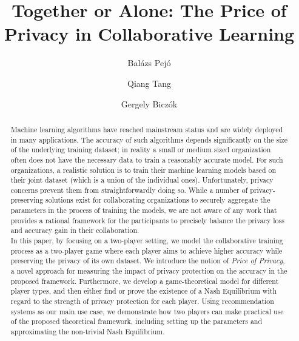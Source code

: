 \documentclass[USenglish,oneside,twocolumn]{article}
\theoremstyle{plain}
\begin{document}

\author*[1]{Bal\'azs Pej\'o}
\author[2]{Qiang Tang}
\author[3]{Gergely Bicz\'ok}


\title{\huge Together or Alone: The Price of Privacy in Collaborative Learning}

	\begin{abstract}
		{Machine learning algorithms have reached mainstream status and are widely deployed in many applications. The accuracy of such algorithms depends significantly on the size of the underlying training dataset; in reality a small or medium sized organization often does not have the necessary data to train a reasonably accurate model. For such organizations, a realistic solution is to train their machine learning models based on their joint dataset (which is a union of the individual ones). Unfortunately, privacy concerns prevent them from straightforwardly doing so. While a number of privacy-preserving solutions exist for collaborating organizations to securely aggregate the parameters in the process of training the models, we are not aware of any work that provides a rational framework for the participants to precisely balance the privacy loss and accuracy gain in their collaboration.\\
        In this paper, by focusing on a two-player setting, we model the collaborative training process as a two-player game where each player aims to achieve higher accuracy while preserving the privacy of its own dataset. We introduce the notion of \textit{Price of Privacy}, a novel approach for measuring the impact of privacy protection on the accuracy in the proposed framework. Furthermore, we develop a game-theoretical model for different player types, and then either find or prove the existence of a Nash Equilibrium with regard to the strength of privacy protection for each player. Using recommendation systems as our main use case, we demonstrate how two players can make practical use of the proposed theoretical framework, including setting up the parameters and approximating the non-trivial Nash Equilibrium.}
	\end{abstract}
\end{document}
